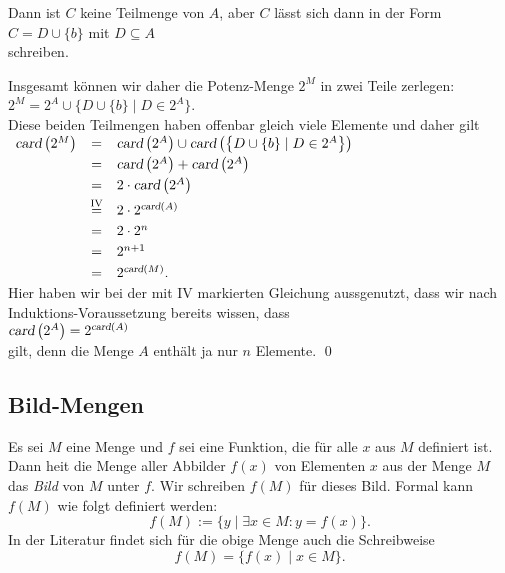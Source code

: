 \begin{enumerate}
\begin{enumerate}
           Dann ist $C$ keine Teilmenge von $A$, aber $C$ l\"{a}sst sich dann in der Form 
           \\[0.2cm]
           \hspace*{1.3cm}
           $C = D \cup \{ b \}$  \quad mit $D \subseteq A$
           \\[0.2cm]
           schreiben.
     \end{enumerate}
     Insgesamt k\"{o}nnen wir daher die Potenz-Menge $2^M$ in zwei Teile zerlegen:
     \\[0.2cm]
     \hspace*{1.3cm}
     $2^M = 2^A \cup \bigl\{ D \cup \{ b \} \mid D \in 2^A \bigr\}$.
     \\[0.2cm]
     Diese beiden Teilmengen haben offenbar gleich viele Elemente und daher gilt
     \\[0.2cm]
     \hspace*{1.3cm}
     $
     \begin{array}[b]{lcl}
          \textsl{card}\left(2^M\right) & = &
          \textsl{card}\left(2^A\right) \cup \textsl{card}\left(\bigl\{ D \cup \{ b \} \mid D \in 2^A \bigr\}\right) \\[0.1cm]
     & = & \textsl{card}\left(2^A\right) + \textsl{card}\left(2^A\right) \\[0.1cm]
     & = & 2 \cdot \textsl{card}\left(2^A\right) \\[0.1cm]
     & \stackrel{\mbox{\scriptsize IV}}{=} & 2 \cdot 2^{\textsl{card}(A)} \\[0.1cm]
     & = & 2 \cdot 2^{n} \\[0.1cm]
     & = & 2^{n+1} \\[0.1cm]
     & = & 2^{\textsl{card}(M)}.  
     \end{array}
     $ 
      \\[0.2cm]
      Hier haben wir bei der mit IV markierten Gleichung aussgenutzt, dass wir nach
      Induktions-Voraussetzung bereits wissen, dass 
      \\[0.2cm]
      \hspace*{1.3cm}
      $\textsl{card}\left(2^A\right) = 2^{\textsl{card}(A)}$
      \\[0.2cm]
      gilt, denn die Menge $A$ enth\"{a}lt ja nur $n$ Elemente.  \qed
\end{enumerate}


\subsection{Bild-Mengen}
Es sei $M$ eine Menge und $f$ sei eine Funktion, die f\"{u}r alle $x$ aus $M$ definiert ist.
Dann hei\3t die Menge aller Abbilder $f(x)$ von Elementen $x$ aus der Menge $M$ das
\emph{Bild} von $M$ unter $f$.  Wir schreiben $f(M)$ f\"{u}r dieses Bild.
Formal kann $f(M)$ wie folgt definiert werden: 
 \[ f(M) := \{ y \;|\; \exists x \in M: y = f(x) \}. \]
In der Literatur findet sich f\"{u}r die obige Menge auch die Schreibweise
\[ f(M) = \bigl\{ f(x) \;|\; x \in M \}. \]

